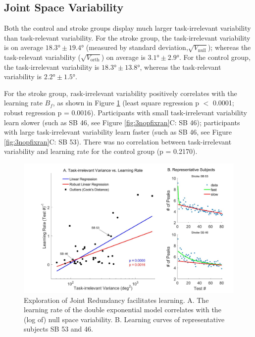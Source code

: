 \subsection{Joint Space Variability}

Both the control and stroke groups display much larger task-irrelevant variability than task-relevant variability.
For the stroke group, the task-irrelevant variability is on average $\ang{18.3} \pm \ang{19.4} $ (measured by standard deviation,$ \sqrt{V_\text{null}} $); whereas the task-relevant variability ($ \sqrt{V_\text{orth}} $) on average is $\ang{3.1} \pm \ang{2.9} $.
For the control group, the task-irrelevant variability is $ \ang{18.3} \pm \ang{13.8} $, whereas the task-relevant variability is $ \ang{2.2} \pm \ang{1.5} $.

For the stroke group, rask-irrelevant variability positively correlates with the learning rate $ B_f $, as shown in Figure \ref{fig:5learnratevsnullvar} (least square regression p $<$ 0.0001; robust regression p = 0.0016). 
Participants with small task-irrelevant variability learn slower (such as SB 46, see Figure \ref{fig:3nopfixran}C: SB 46);
participants with large task-irrelevant variability learn faster (such as SB 46, see Figure \ref{fig:3nopfixran}C: SB 53).
There was no correlation between task-irrelevant variability and learning rate for the control group (p = 0.2170).

\begin{figure}
	\centering
	\includegraphics[width=1\linewidth]{figures/5learnRateVSnullVar}
	\caption[Exploration of Joint Redundancy facilitates learning]
	{Exploration of Joint Redundancy facilitates learning. 
		A. The learning rate of the double exponential model correlates with the (log of) null space variability. 
		B. Learning curves of representative subjects SB 53 and 46. }
	\label{fig:5learnratevsnullvar}
\end{figure}



